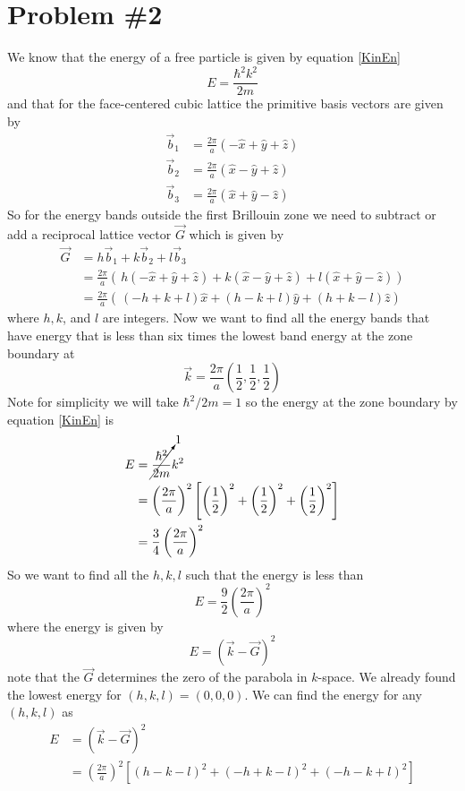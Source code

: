 \documentclass[11pt]{article}
\numberwithin{equation}{section}
\begin{document}
\section{Problem \#2}
We know that the energy of a free particle is given by equation \ref{KinEn}
$$E = \frac{\hbar^2k^2}{2m}$$
and that for the face-centered cubic lattice the primitive basis vectors are given by
\begin{align*}
\vec{b}_1 &= \frac{2\pi}{a}(-\hat{x}+\hat{y}+\hat{z})\\
\vec{b}_2 &= \frac{2\pi}{a}(\hat{x}-\hat{y}+\hat{z})\\
\vec{b}_3 &= \frac{2\pi}{a}(\hat{x}+\hat{y}-\hat{z})
\end{align*}
So for the energy bands outside the first Brillouin zone we need to subtract or add a reciprocal lattice vector $\vec{G}$ which is given by
\begin{align*}
\vec{G} &= h\vec{b}_1 + k\vec{b}_2 + l\vec{b}_3\\
&= \frac{2\pi}{a}\left(\frac{}{}h(-\hat{x}+\hat{y}+\hat{z}) + k(\hat{x}-\hat{y}+\hat{z}) + l(\hat{x}+\hat{y}-\hat{z})\right)\\
&= \frac{2\pi}{a}\left(\frac{}{}(-h+k+l)\hat{x} + (h-k+l)\hat{y} + (h+k-l)\hat{z}\right)
\end{align*}
where $h,k$, and $l$ are integers. Now we want to find all the energy bands that have energy that is less than six times the lowest band energy at the zone boundary at 
$$\vec{k} = \frac{2\pi}{a}\left(\frac{1}{2},\frac{1}{2},\frac{1}{2}\right)$$
Note for simplicity we will take $\hbar^2/2m =1$ so the energy at the zone boundary by equation \ref{KinEn} is
\begin{align*}
E &= \cancelto{1}{\frac{\hbar^2}{2m}}k^2\\
&= \left(\frac{2\pi}{a}\right)^2\left[\left(\frac{1}{2}\right)^2+\left(\frac{1}{2}\right)^2+\left(\frac{1}{2}\right)^2\right]\\
&= \frac{3}{4}\left(\frac{2\pi}{a}\right)^2
\end{align*}
So we want to find all the $h,k,l$ such that the energy is less than 
$$E = \frac{9}{2}\left(\frac{2\pi}{a}\right)^2$$
where the energy is given by
$$E = (\vec{k} - \vec{G})^2$$
note that the $\vec{G}$ determines the zero of the parabola in $k$-space. We already found the lowest energy for $(h,k,l) = (0,0,0)$. We can find the energy for any $(h,k,l)$ as
\begin{align*}
E &= (\vec{k} - \vec{G})^2\\
&= \left(\frac{2\pi}{a}\right)^2\left[\left(h-k-l\right)^2 +\left(-h+k-l\right)^2 +\left(-h-k+l\right)^2\right]
\end{align*}
\end{document}
